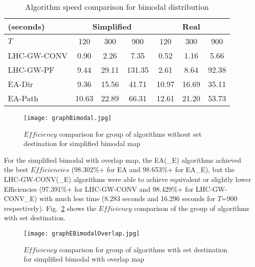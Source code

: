 \begin{table}
	\centering
		\begin{tabular}
			{|l|c|c|c|c|c|c|}
			\hline
			(seconds) & \multicolumn{3}{|c|}{Simplified} & \multicolumn{3}{|c|}{Real} \\
			\hline
			$T$ & 120 & 300 & 900	& 120 & 300 & 900 \\
			\hline
			LHC-GW-CONV & 0.90 & 2.26 & 7.35 & 0.52 & 1.16 & 5.66 \\
			\hline
			LHC-GW-PF	& 9.44 & 29.11 & 131.35 & 2.61 & 8.64 & 92.38 \\
			\hline
			EA-Dir & 9.36 & 15.56 & 41.71 & 10.97 & 16.69 & 35.11 \\
			\hline
			EA-Path & 10.63 & 22.89 & 66.31 & 12.61 & 21.20 & 53.73 \\
			\hline
		\end{tabular}
\caption{Algorithm speed comparison for bimodal distribution}
\label{TBimodalSimplified}
\vspace*{-7ex}
\end{table}

\begin{figure}
\vspace*{-2ex}
\centering
\texttt{[image: graphBimodal.jpg]}
\caption{$\mathit{Efficiency}$ comparison for group of algorithms without set destination for simplified bimodal map}
\label{graphBimodal}
\vspace*{-2ex}
\end{figure}

For the simplified bimodal with overlap map, the EA(\_E) algorithms achieved the best $\mathit{Efficiencies}$ (98.302\%+ for EA and 98.653\%+ for EA\_E), but the LHC-GW-CONV(\_E) algorithms were able to achieve equivalent or slightly lower Efficiencies (97.391\%+ for LHC-GW-CONV and 98.429\%+ for LHC-GW-CONV\_E) with much less time (8.283 seconds and 16.296 seconds for $T$=900 respectively). Fig.~\ref{graphEBimodalOverlap} shows the $\mathit{Efficiency}$ comparison of the group of algorithms with set destination.

\begin{figure}
\centering
\texttt{[image: graphEBimodalOverlap.jpg]}
\caption{$\mathit{Efficiency}$ comparison for group of algorithms with set destination for simplified bimodal with overlap map}
\label{graphEBimodalOverlap}
\vspace*{-4ex}
\end{figure}


